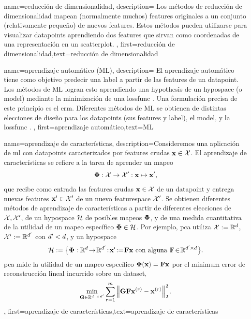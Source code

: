 {name={reducción de dimensionalidad},
	description={
		Los métodos de reducción de dimensionalidad
		mapean (normalmente muchos) \gls{feature}s originales a un conjunto (relativamente pequeño) de
		nuevos \gls{feature}s. Estos métodos pueden utilizarse para visualizar \gls{datapoint}s
		aprendiendo dos \gls{feature}s que sirvan como coordenadas de una representación
		en un \gls{scatterplot}.
	},
	first={reducción de dimensionalidad},text={reducción de dimensionalidad}
}



{name={aprendizaje automático (ML)},
	description={
		El aprendizaje automático tiene como objetivo predecir
		una \gls{label} a partir de las \gls{feature}s de un \gls{datapoint}. Los métodos de ML logran esto
		aprendiendo una \gls{hypothesis} de un \gls{hypospace} (o \gls{model})
		mediante la minimización de una \gls{lossfunc} \cite{MLBasics,HastieWainwrightBook}.
		Una formulación precisa de este principio es el \gls{erm}.
		Diferentes métodos de ML se obtienen de distintas elecciones de diseño para los
		\gls{datapoint}s (sus \gls{feature}s y \gls{label}),
		el \gls{model}, y la \gls{lossfunc} \cite[Cap. 3]{MLBasics}.
	},
	first={aprendizaje automático},text={ML}
}


{name={aprendizaje de características},
	description={Consideremos una aplicación de \gls{ml} con \gls{datapoint}s caracterizados por 
	\gls{feature}s crudas ${\bf x} \in \mathcal{X}$. El aprendizaje de características
	se refiere a la tarea de aprender un mapeo
		$${\bf \Phi}: \mathcal{X} \rightarrow \mathcal{X}': {\bf x} \mapsto {\bf x}',$$ 
		que recibe como entrada las \gls{feature}s crudas ${\bf x} \in \mathcal{X}$ de un \gls{datapoint} y entrega nuevas
		\gls{feature}s ${\bf x}' \in \mathcal{X}'$ de un nuevo \gls{featurespace} $\mathcal{X}'$. 
		Se obtienen diferentes métodos de aprendizaje de características a partir de diferentes elecciones de 
		$\mathcal{X},\mathcal{X}'$, de un \gls{hypospace} $\mathcal{H}$ de posibles mapeos ${\bf \Phi}$, 
		y de una medida cuantitativa de la utilidad de un mapeo específico ${\bf \Phi} \in \mathcal{H}$. Por ejemplo, \gls{pca} utiliza $\mathcal{X} := \mathbb{R}^{d}$, $\mathcal{X}' := \mathbb{R}^{d'}$
		con $d' < d$, y un \gls{hypospace}
		$$\hypospace\defeq \big\{ \featuremapvec: \mathbb{R}^{\dimlocalmodel}
		\!\rightarrow\! \mathbb{R}^{\dimlocalmodel'}\!:\!\featurevec'\!\defeq\!\mF \featurevec \mbox{ con alguna } \mF \!\in\! \mathbb{R}^{\dimlocalmodel' \times \dimlocalmodel} \big\}.$$ \Gls{pca} mide la utilidad de un mapeo específico ${\bf \Phi}({\bf x})= \mathbf{F} {\bf x}$ 
		por el \gls{minimum} error de reconstrucción lineal incurrido sobre un \gls{dataset}, 
$$ \min_{\mG \in \mathbb{R}^{\dimlocalmodel \times \dimlocalmodel'}} \sum_{\sampleidx=1}^{\samplesize} \normgeneric{\mG \mF \featurevec^{(\sampleidx)} - \featurevec^{(\sampleidx)}}{2}^{2}.$$ }, 
	first={aprendizaje de características},text={aprendizaje de características}
} 


